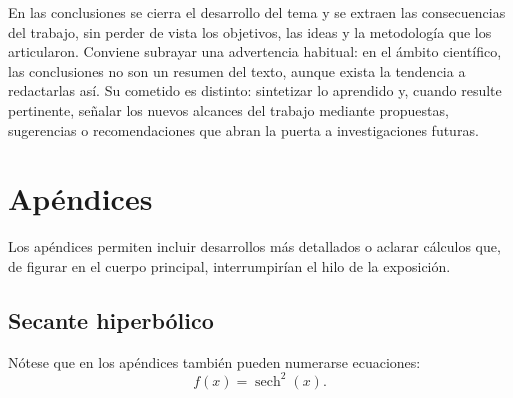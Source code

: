 \documentclass[11pt,letterpaper]{article}
\DeclareMathOperator{\sech}{sech}
\begin{document}
En las conclusiones se cierra el desarrollo del tema y se extraen las consecuencias del
trabajo, sin perder de vista los objetivos, las ideas y la metodología que los
articularon. Conviene subrayar una advertencia habitual: en el ámbito científico, las
conclusiones no son un resumen del texto, aunque exista la tendencia a redactarlas así.
Su cometido es distinto: sintetizar lo aprendido y, cuando resulte pertinente, señalar
los nuevos alcances del trabajo mediante propuestas, sugerencias o recomendaciones que
abran la puerta a investigaciones futuras.

\appendix
\section{Apéndices}\label{app:apendices}

Los apéndices permiten incluir desarrollos más detallados o aclarar cálculos que, de
figurar en el cuerpo principal, interrumpirían el hilo de la exposición.

\subsection{Secante hiperbólico}\label{app:secante}

Nótese que en los apéndices también pueden numerarse ecuaciones:
\begin{equation}
  f(x) = \sech^{2}(x).
\end{equation}


\end{document}
